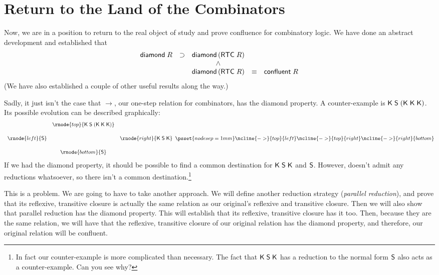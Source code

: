 \documentclass[12pt]{article}
\newcommand{\KC}{\con{K}}
\newcommand{\SC}{\con{S}}
\begin{document}
\section{Return to the Land of the Combinators}
\label{sec:Return-to-Land}

Now, we are in a position to return to the real object of study and
prove confluence for combinatory logic.  We have done an abstract
development and established that\[
\begin{array}{ccccc}
{\sf diamond}\;R & \supset & {\sf diamond}\,({\sf RTC}\;R)\\
& & \land\\
& & {\sf diamond}\,({\sf RTC}\;R) & \equiv & {\sf confluent}\;R\\
\end{array}
\]  (We have also established a couple of other useful results along
the way.)

\newcommand{\topk}{\KC\;\SC\;(\KC\;\KC\;\KC)} Sadly, it just isn't the
case that $\rightarrow$, our one-step relation for combinators, has
the diamond property.  A counter-example is $\topk$.  Its possible evolution
can be described graphically: \[
\begin{array}{ccc}
& \rnode{top}{\topk}\\[5mm]
\rnode{left}{\SC} & & \rnode{right}{\KC\;\SC\;\KC}\\[5mm]
& \rnode{bottom}{\SC}
\end{array}
\psset{nodesep=1mm}
\ncline{->}{top}{left}
\ncline{->}{top}{right}
\ncline{->}{right}{bottom}
\]
If we had the diamond property, it should be possible to find a common
destination for $\KC\;\SC\;\KC$ and $\SC$.  However, \SC{} doesn't
admit any reductions whatsoever, so there isn't a common
destination.\footnote{In fact our counter-example is more complicated
  than necessary.  The fact that $\KC\;\SC\;\KC$ has a
  reduction to the normal form $\SC$ also acts as a counter-example.
  Can you see why?}

This is a problem.  We are going to have to take another approach.
We will define another reduction strategy (\emph{parallel reduction}),
and prove that its reflexive, transitive closure is actually the same
relation as our original's reflexive and transitive closure.  Then we
will also show that parallel reduction has the diamond property.  This
will establish that its reflexive, transitive closure has it too.
Then, because they are the same relation, we will have that the
reflexive, transitive closure of our original relation has the diamond
property, and therefore, our original relation will be confluent.
\end{document}
